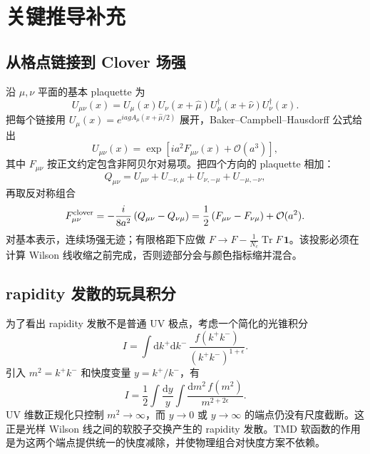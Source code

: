 \documentclass[UTF8,12pt,a4paper,twoside,openany]{ctexbook}
\newcommand{\dd}{\mathrm{d}}
\newcommand{\Tr}{\operatorname{Tr}}
\begin{document}
\clearpage
\chapter{关键推导补充}

\section{从格点链接到 Clover 场强}

沿 \(\mu,\nu\) 平面的基本 plaquette 为
\begin{equation}
  U_{\mu\nu}(x)
  =U_\mu(x)U_\nu(x+\hat\mu)
  U_\mu^\dagger(x+\hat\nu)U_\nu^\dagger(x).
  \label{eq:plaquette}
\end{equation}
把每个链接用 \(U_\mu(x)=e^{iagA_\mu(x+\hat\mu/2)}\) 展开，Baker--Campbell--Hausdorff 公式给出
\begin{equation}
  U_{\mu\nu}(x)
  =\exp\left[ia^2F_{\mu\nu}(x)+\mathcal O(a^3)\right],
  \label{eq:plaquettebch}
\end{equation}
其中 \(F_{\mu\nu}\) 按正文约定包含非阿贝尔对易项。把四个方向的 plaquette 相加：
\begin{equation}
  Q_{\mu\nu}
  =U_{\mu\nu}+U_{-\nu,\mu}+U_{\nu,-\mu}+U_{-\mu,-\nu},
  \label{eq:cloversum}
\end{equation}
再取反对称组合
\begin{equation}
  F_{\mu\nu}^{\rm clover}
  =-\frac{i}{8a^2}\left(Q_{\mu\nu}-Q_{\nu\mu}\right)
  =\frac{1}{2}\left(F_{\mu\nu}-F_{\nu\mu}\right)+\mathcal O(a^2).
  \label{eq:cloverderive}
\end{equation}
对基本表示，连续场强无迹；有限格距下应做 \(F\to F-\frac1{N_c}\Tr F\,\mathbf 1\)。该投影必须在计算 Wilson 线收缩之前完成，否则迹部分会与颜色指标缩并混合。

\section{rapidity 发散的玩具积分}

为了看出 rapidity 发散不是普通 UV 极点，考虑一个简化的光锥积分
\begin{equation}
  I=\int\dd k^+\dd k^-\,
  \frac{f(k^+k^-)}{(k^+k^-)^{1+\epsilon}}.
  \label{eq:rapiditytoy}
\end{equation}
引入 \(m^2=k^+k^-\) 和快度变量 \(y=k^+/k^-\)，有
\begin{equation}
  I=\frac12\int\frac{\dd y}{y}
  \int\frac{\dd m^2\,f(m^2)}{m^{2+2\epsilon}}.
  \label{eq:rapiditytoy2}
\end{equation}
UV 维数正规化只控制 \(m^2\to\infty\)，而 \(y\to0\) 或 \(y\to\infty\) 的端点仍没有尺度截断。这正是光样 Wilson 线之间的软胶子交换产生的 rapidity 发散。TMD 软函数的作用是为这两个端点提供统一的快度减除，并使物理组合对快度方案不依赖。
\end{document}
